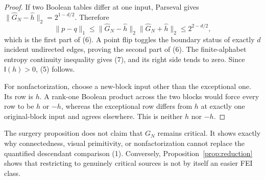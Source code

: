 \begin{proof}
If two Boolean tables differ at one input, Parseval gives
$\|\widehat G_N-\widehat h\|_2=2^{1-d/2}$.  Therefore
\[
 \|p-q\|_1\le
 \|\widehat G_N-\widehat h\|_2
 \|\widehat G_N+\widehat h\|_2\le2^{2-d/2},
\]
which is the first part of (6).  A point flip toggles the boundary status of
exactly $d$ incident undirected edges, proving the second part of (6).
The finite-alphabet entropy continuity inequality gives (7), and its right
side tends to zero.  Since $\mathsf I(h)>0$, (5) follows.

For nonfactorization, choose a new-block input other than the exceptional
one.  Its row is $h$.  A rank-one Boolean product across the two blocks would
force every row to be $h$ or $-h$, whereas the exceptional row differs from
$h$ at exactly one original-block input and agrees elsewhere.  This is
neither $h$ nor $-h$.
\end{proof}

The surgery proposition does not claim that $G_N$ remains critical.  It
shows exactly why connectedness, visual primitivity, or nonfactorization
cannot replace the quantified descendant comparison (1).  Conversely,
Proposition~\ref{prop:reduction} shows that restricting to genuinely critical
sources is not by itself an easier FEI class.

